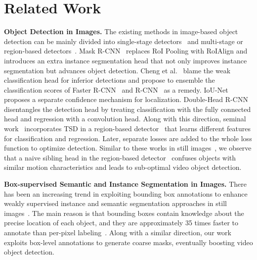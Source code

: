 \documentclass[10pt,twocolumn,letterpaper]{article}
\begin{document}
\section{Related Work}
\label{sec:related_work}

\noindent \textbf{Object Detection in Images.}
\label{sec:rel_object_detection}
The existing methods in image-based object detection can be mainly divided into single-stage detectors~\cite{liu2016ssd,redmon2016you,redmon2017yolo9000, redmon2018yolov3, chen2021you, ge2021yolox} and multi-stage or region-based detectors~\cite{ren2015faster, cai2018cascade, chen2019hybrid, guo2020augfpn, jiang2020sp}. Mask R-CNN~\cite{he2017mask} replaces RoI Pooling with RoIAlign and introduces an extra instance segmentation head that not only improves instance segmentation but advances object detection. Cheng et al.~\cite{cheng2018revisiting} blame the weak classification head for inferior detections and propose to ensemble the classification scores of Faster R-CNN~\cite{ren2015faster} and R-CNN~\cite{girshick2014rich} as a remedy. IoU-Net~\cite{jiang2018acquisition} proposes a separate confidence mechanism for localization. Double-Head R-CNN~\cite{wu2020rethinking} disentangles the detection head by treating classification with the fully connected head and regression with a convolution head. Along with this direction, seminal work~\cite{song2020revisiting} incorporates TSD in a region-based detector~\cite{ren2015faster} that learns different features for classification and regression. Later, separate losses are added to the whole loss function to optimize detection. Similar to these works in still images~\cite{he2017mask, wu2020rethinking, song2020revisiting, jiang2018acquisition}, we observe that a naive sibling head in the region-based detector~\cite{ren2015faster} confuses objects with similar motion characteristics and leads to sub-optimal video object detection.

\noindent \textbf{Box-supervised Semantic and Instance Segmentation in Images.}
\label{sec:rel_bounding_box}
There has been an increasing trend in exploiting bounding box annotations to enhance weakly supervised instance and semantic segmentation approaches in still images~\cite{dai2015boxsup, bbox_2seg, bbox_SDI, bounding_box, budget_bbox}. The main reason is that bounding boxes contain knowledge about the precise location of each object, and they are approximately 35 times faster to annotate than per-pixel labeling~\cite{everingham2010pascal, bearman2016s}. Along with a similar direction, our work exploits box-level annotations to generate coarse masks, eventually boosting video object detection.
\end{document}
